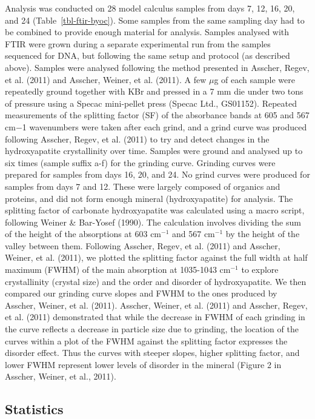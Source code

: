 \documentclass[
]{article}
\begin{document}
Analysis was conducted on 28 model calculus samples from days 7, 12, 16,
20, and 24 (Table~\ref{tbl-ftir-byoc}). Some samples from the same
sampling day had to be combined to provide enough material for analysis.
Samples analysed with FTIR were grown during a separate experimental run
from the samples sequenced for DNA, but following the same setup and
protocol (as described above). Samples were analysed following the
method presented in Asscher, Regev, et al. (2011) and Asscher, Weiner,
et al. (2011). A few \(\mu\)g of each sample were repeatedly ground
together with KBr and pressed in a 7 mm die under two tons of pressure
using a Specac mini-pellet press (Specac Ltd., GS01152). Repeated
measurements of the splitting factor (SF) of the absorbance bands at 605
and 567 cm−1 wavenumbers were taken after each grind, and a grind curve
was produced following Asscher, Regev, et al. (2011) to try and detect
changes in the hydroxyapatite crystallinity over time. Samples were
ground and analysed up to six times (sample suffix a-f) for the grinding
curve. Grinding curves were prepared for samples from days 16, 20, and
24. No grind curves were produced for samples from days 7 and 12. These
were largely composed of organics and proteins, and did not form enough
mineral (hydroxyapatite) for analysis. The splitting factor of carbonate
hydroxyapatite was calculated using a macro script, following Weiner \&
Bar-Yosef (1990). The calculation involves dividing the sum of the
height of the absorptions at 603 cm\(^{-1}\) and 567 cm\(^{-1}\) by the
height of the valley between them. Following Asscher, Regev, et al.
(2011) and Asscher, Weiner, et al. (2011), we plotted the splitting
factor against the full width at half maximum (FWHM) of the main
absorption at 1035-1043 cm\(^{-1}\) to explore crystallinity (crystal
size) and the order and disorder of hydroxyapatite. We then compared our
grinding curve slopes and FWHM to the ones produced by Asscher, Weiner,
et al. (2011). Asscher, Weiner, et al. (2011) and Asscher, Regev, et al.
(2011) demonstrated that while the decrease in FWHM of each grinding in
the curve reflects a decrease in particle size due to grinding, the
location of the curves within a plot of the FWHM against the splitting
factor expresses the disorder effect. Thus the curves with steeper
slopes, higher splitting factor, and lower FWHM represent lower levels
of disorder in the mineral (Figure 2 in Asscher, Weiner, et al., 2011).

\hypertarget{statistics}{%
\subsection{Statistics}\label{statistics}}
\end{document}
